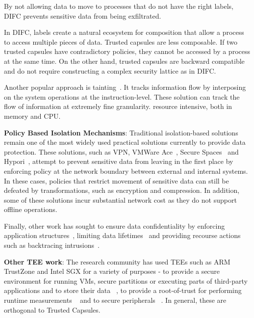By not allowing data to move to processes that do not have the right labels,
DIFC prevents sensitive data from being exfiltrated. 
 
In DIFC, labels create a natural ecosystem for composition that allow a process
to access multiple pieces of data. Trusted capsules are less composable. If two
trusted capsules have contradictory policies, they cannot be accessed by a
process at the same time. On the other hand, trusted capsules are backward
compatible and do not require constructing a complex security lattice as in
DIFC.

Another popular approach is tainting~\cite{demandemulation, neon, taintdroid,
practicaltainting}. It tracks information flow by interposing on the system
operations at the instruction-level. 
These solution can track the flow of information at extremely fine granularity.
resource intensive, both in memory and CPU. 

\textbf{Policy Based Isolation Mechanisms}: Traditional isolation-based
solutions remain one of the most widely used practical solutions currently to
provide data protection. These solutions, such as VPN, VMWare
Ace~\cite{VMWareAce}, Secure Spaces~\cite{securespaces} and
Hypori~\cite{hypori}, attempt to prevent sensitive data from leaving in the
first place by enforcing policy at the network boundary between external and
internal systems. In these cases, policies that restrict movement of sensitive
data can still be defeated by transformations, such as encryption and
compression. In addition, some of these solutions incur substantial network cost
as they do not support offline operations. 

Finally, other work has sought to ensure data confidentiality by enforcing
application structures~\cite{Cleanroom, privacycapsules}, limiting data
lifetimes~\cite{enforcinglifetime, lacuna} and providing recourse actions such
as backtracing intrusions~\cite{Backtracking, taser}.


\textbf{Other TEE work}: The research community has used TEEs such as ARM
TrustZone and Intel SGX for a variety of purposes - to provide a secure
environment for running VMs, secure partitions or executing parts of third-party
applications and to store their data   ~\cite{TLR, Nokia1, Nokia2}, to provide a
root-of-trust for performing runtime measurements ~\cite{restrictedspaces,
hypervision,SKEE,secvisor} and to secure peripherals ~\cite{TrustedSensors}. In
general, these are orthogonal to Trusted Capsules. 

